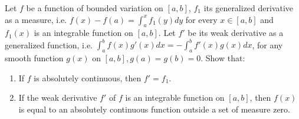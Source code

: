 \begin{exercise}
\label{analysis:2013:8}
Let $f$ be a function of bounded variation on $[a, b]$, $f_1$ its generalized derivative as a measure, i.e. $f(x) - f(a) = \int_a^x f_1(y) dy$ for every $x \in [a, b]$ and $f_1(x)$ is an integrable function on $[a, b]$. Let $f'$ be its weak derivative as a generalized function, i.e. $\int_a^b f(x) g'(x) dx = -\int_a^b f'(x) g(x) dx$, for any smooth function $g(x)$ on $[a, b], g(a) = g(b) = 0$. Show that:
\begin{enumerate}
    \item If $f$ is absolutely continuous, then $f' = f_1$.
    \item If the weak derivative $f'$ of $f$ is an integrable function on $[a, b]$, then $f(x)$ is equal to an absolutely continuous function outside a set of measure zero.
\end{enumerate}
\end{exercise}

